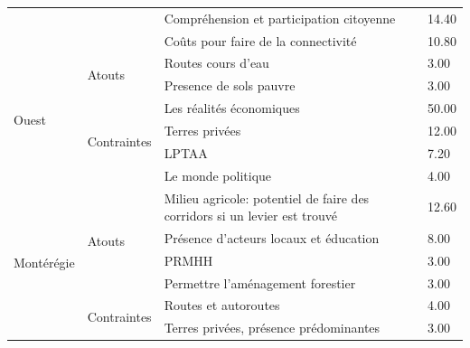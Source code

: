 \begin{table}[h!]
\begin{tabular}{m{}lm{}l}
                       &                              & Compréhension et participation citoyenne            & 14.40 \\ \cline{3-4} 
                       &                              & Coûts pour faire de la connectivité                 & 10.80 \\ \hline
\multirow{6}{*}{Ouest} & \multirow{2}{*}{Atouts}      & Routes cours d'eau                                  & 3.00  \\ \cline{3-4} 
                       &                              & Presence de sols pauvre                             & 3.00  \\ \cline{2-4} 
                       & \multirow{4}{*}{Contraintes} & Les réalités économiques                            & 50.00 \\ \cline{3-4} 
                       &                              & Terres privées                                      & 12.00 \\ \cline{3-4} 
                       &                              & LPTAA                                               & 7.20  \\ \cline{3-4} 
                       &                              & Le monde politique                                  & 4.00  \\ \hline
\multirow{6}{*}{Montérégie} &
  \multirow{4}{*}{Atouts} &
  Milieu agricole: potentiel de faire des corridors si un levier est trouvé &
  12.60 \\ \cline{3-4} 
                       &                              & Présence d'acteurs locaux et éducation              & 8.00  \\ \cline{3-4} 
                       &                              & PRMHH                                               & 3.00  \\ \cline{3-4} 
                       &                              & Permettre l'aménagement forestier                   & 3.00  \\ \cline{2-4} 
                       & \multirow{2}{*}{Contraintes} & Routes et autoroutes                                & 4.00  \\ \cline{3-4} 
                       &                              & Terres privées, présence prédominantes              & 3.00  \\ \hline
\end{tabular}
\end{table}


